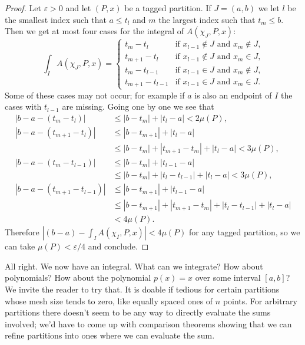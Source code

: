 \documentclass[11pt]{amsart}
\theoremstyle{definition}
\def\eps{\varepsilon}
\begin{document}
\begin{proof}
Let $\eps > 0$ and let $(P,x)$ be a tagged partition.
If $J = (a,b)$ we let $l$ be the smallest index such that $a \leq t_l$ and $m$ the largest index such that $t_m \leq b$.
Then we get at most four cases for the integral of $A(\chi_J, P, x)$:
\[
\int_I A(\chi_J, P, x)
= \begin{cases}
t_m - t_l & \text{if $x_{l-1} \not\in J$ and $x_{m} \not\in J$,}
\\
t_{m+1} - t_l & \text{if $x_{l-1} \not\in J$ and $x_{m} \in J$,}
\\
t_m - t_{l-1} & \text{if $x_{l-1} \in J$ and $x_{m} \not\in J$,}
\\
t_{m+1} - t_{l-1} & \text{if $x_{l-1} \in J$ and $x_{m} \in J$.}
\end{cases}
\]
Some of these cases may not occur; for example if $a$ is also an endpoint of $I$ the cases with $t_{l-1}$ are missing.
Going one by one we see that
\begin{align*}
|b - a - (t_m - t_l)|
&\leq |b - t_m| + |t_l - a|
< 2 \mu(P),
\\
|b - a - (t_{m+1} - t_l)|
&\leq |b - t_{m+1}| + |t_l - a|
\\
&\leq |b - t_{m}| + |t_{m+1} - t_m| + |t_l - a|
< 3 \mu(P),
\\
|b - a - (t_{m} - t_{l-1})|
&\leq |b - t_{m}| + |t_{l-1} - a|
\\
&\leq |b - t_{m}| + |t_{l} - t_{l-1}| + |t_l - a|
< 3 \mu(P),
\\
|b - a - (t_{m+1} - t_{l-1})|
&\leq |b - t_{m+1}| + |t_{l-1} - a|
\\
&\leq |b - t_{m+1}| + |t_{m+1} - t_m| + |t_{l} - t_{l-1}| + |t_l - a|
\\
&< 4 \mu(P).
\end{align*}
Therefore $|(b - a) - \int_I A(\chi_I, P, x)| < 4\mu(P)$ for any tagged partition, so we can take $\mu(P) < \eps / 4$ and conclude.
\end{proof}


All right.
We now have an integral.
What can we integrate?
How about polynomials?
How about the polynomial $p(x) = x$ over some interval $[a,b]$?
We invite the reader to try that.
It is doable if tedious for certain partitions whose mesh size tends to zero, like equally spaced ones of $n$ points.
For arbitrary partitions there doesn't seem to be any way to directly evaluate the sums involved; we'd have to come up with comparison theorems showing that we can refine partitions into ones where we can evaluate the sum.
\end{document}
